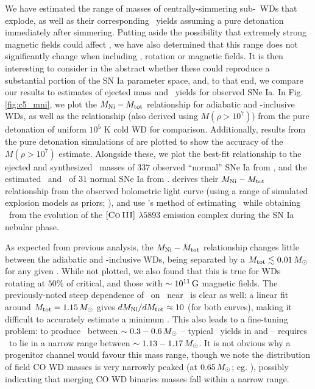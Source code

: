 
We have estimated the range of masses of centrally-simmering sub-\Mch\ WDs that explode, as well as their corresponding \MNi\ yields assuming a pure detonation immediately after simmering.  Putting aside the possibility that extremely strong magnetic fields could affect \vconv, we have also determined that this range does not significantly change when including \dnabconv, rotation or magnetic fields.  It is then interesting to consider in the abstract whether these could reproduce a substantial portion of the SN Ia parameter space, and, to that end, we compare our results to estimates of ejected mass and \Ni\ yields for observed SNe Ia.  In Fig. \ref{fig:c5_mni}, we plot the $\MNi-\Mtot$ relationship for adiabatic and \dnabconv-inclusive WDs, as well as the relationship (also derived using $M(\rho>10^7)$) from the pure detonation of uniform $10^5$ K cold WD for comparison.  Additionally, results from the pure detonation simulations of \cite{sim+10} are plotted to show the accuracy of the $M(\rho>10^7)$ estimate.  Alongside these, we plot the best-fit relationship to the ejected and synthesized \Ni\ masses of $337$ observed ``normal'' \citep{bran+06} SNe Ia from \cite{scalzrs14}, and the estimated \Mtot\ and \MNi\ of $31$ normal SNe Ia from \cite{chil+15}.  \cite{scalzrs14} derives their $\MNi-\Mtot$ relationship from the observed bolometric light curve (using a range of simulated explosion models as priors; \citealt{scalz+14}), and \cite{chil+15} use \cite{scalzrs14}'s method of estimating \Mtot\ while obtaining \MNi\ from the evolution of the $[\textsc{Co\,III}]$ $\lambda5893$ emission complex during the SN Ia nebular phase.


As expected from previous analysis, the $\MNi-\Mtot$ relationship changes little between the adiabatic and \dnabconv-inclusive WDs, being separated by a $\Mtot\lesssim0.01\,\Msun$ for any given \MNi.  While not plotted, we also found that this is true for WDs rotating at $50$\% of critical, and those with $\sim10^{11}\,\mathrm{G}$ magnetic fields.  The previously-noted steep dependence of \MNi\ on \Mtot\ near \Mcrit\ is clear as well: a linear fit around $\Mtot = 1.15\,\Msun$ gives $d\MNi/d\Mtot \approx 10$ (for both curves), making it difficult to accurately estimate a minimum \MNi.  This also leads to a fine-tuning problem: to produce \MNi\ between $\sim0.3-0.6\,\Msun$ -- typical \MNi\ yields in \cite{scalzrs14} and \cite{chil+15} -- requires \Mtot\ to lie in a narrow range between $\sim 1.13 - 1.17\,\Msun$.  It is not obvious why a progenitor channel would favour this mass range, though we note the distribution of field CO WD masses is very narrowly peaked (at $0.65\,\Msun$; eg. \citealt{tremb09, klei+13}), possibly indicating that merging CO WD binaries masses fall within a narrow range.

